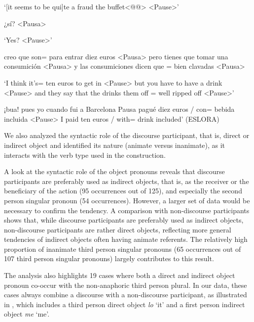\documentclass[output=paper]{langscibook}
\begin{document}
\ea\label{ex:pierre:7}
\begin{xlist}[Speaker 2]
 ‘[it seems to be qui]te a fraud the buffet<@@> <Pause>’

 ¿sí? <Pausa>

 ‘Yes? {{<Pause>’} }

 creo que son= para entrar diez euros <Pausa> pero tienes que tomar una consumición <Pausa> y las consumiciones dicen que {}{{= bien clavadas <Pausa>}}

 ‘I think it's= ten euros to get in {{<Pause>} }{but you have to have a drink} {{<Pause>} }{and they say that the drinks} {  }{them off = well ripped off} {{<Pause>’}}

 ¡bua! pues yo cuando fui a Barcelona Pausa pagué diez euros / con= bebida incluida
 {{<Pause>} }{I paid ten euros / with= drink included’ (ESLORA)}
\end{xlist}
\z 

We also analyzed the syntactic role of the discourse participant, that is, direct or indirect object and identified its nature (animate versus inanimate), as it interacts with the verb type used in the construction.


A look at the syntactic role of the object pronouns reveals that discourse participants are preferably used as indirect objects, that is, as the receiver or the beneficiary of the action (95 occurrences out of 125), and especially the second person singular pronoun (54 occurrences). However, a larger set of data would be necessary to confirm the tendency. A comparison with non-discourse participants shows that, while discourse participants are preferably used as indirect objects, non-discourse participants are rather direct objects, reflecting more general tendencies of indirect objects often having animate referents. The relatively high proportion of inanimate third person singular pronouns (65 occurrences out of 107 third person singular pronouns) largely contributes to this result.  


The analysis also highlights 19 cases where both a direct and indirect object pronoun co-occur with the non-anaphoric third person plural. In our data, these cases always combine a discourse with a non-discourse participant, as illustrated in , which includes a third person direct object \textit{lo} ‘it’ and a first person indirect object \textit{me} ‘me’.
\end{document}
